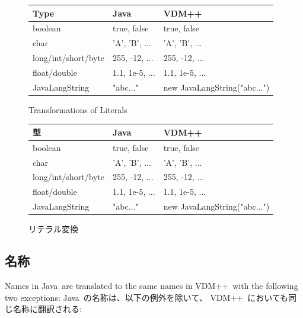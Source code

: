 \documentclass[\pformat,12pt]{jarticle}
\newcommand{\vdmslpp}{VDM++}
\newcommand{\JAVA}{Java}
\newcommand{\VDM}{VDM++}
\begin{document}
\begin{figure}[htbp]
  \begin{center}
\begin{longtable}{|l|l|l|}
\hline
Type &  \JAVA\   & \VDM\ \\ \hline \hline
  boolean   & true, false  & true, false   \\ \hline
  char      & 'A', 'B', ...    & 'A', 'B', ...  \\ \hline
  long/int/short/byte  & 255, -12, ...  & 255, -12, ...    \\ \hline
  float/double  & 1.1, 1e-5, ...  & 1.1, 1e-5, ...  \\ \hline
  JavaLangString    & "abc..."  & new JavaLangString("abc...") \\ \hline
\end{longtable}    
    \caption{Transformations of Literals}
    \label{fig:litxfs}
  \end{center}
\end{figure}

\begin{figure}[htbp]
  \begin{center}
\begin{longtable}{|l|l|l|}
\hline
型 &  \JAVA\   & \VDM\ \\ \hline \hline
  boolean   & true, false  & true, false   \\ \hline
  char      & 'A', 'B', ...    & 'A', 'B', ...  \\ \hline
  long/int/short/byte  & 255, -12, ...  & 255, -12, ...    \\ \hline
  float/double  & 1.1, 1e-5, ...  & 1.1, 1e-5, ...  \\ \hline
  JavaLangString    & "abc..."  & new JavaLangString("abc...") \\ \hline
\end{longtable}    
    \caption{リテラル変換}
    \label{fig:litxfs}
  \end{center}
\end{figure}



\subsection{名称}\label{names}

Names in \JAVA\ are translated to the same names in \vdmslpp\ with the
following two exceptions:
\JAVA\ の名称は、以下の例外を除いて、 \vdmslpp\ においても同じ名称に翻訳される:
\end{document}
